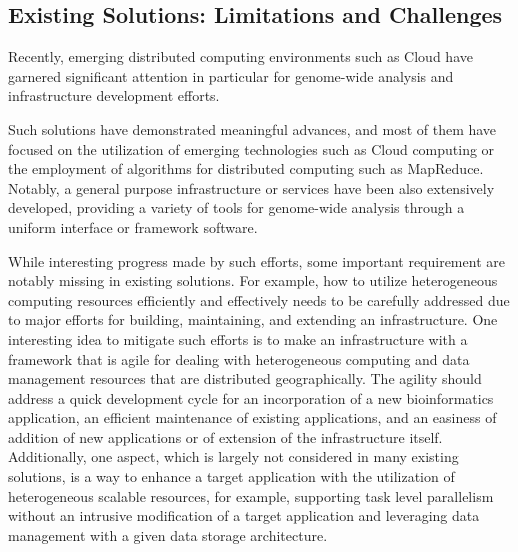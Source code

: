 \documentclass{acm_proc_article-sp}
\begin{document}
\subsection{Existing Solutions: Limitations and Challenges}


Recently, emerging distributed computing environments such as Cloud have garnered significant attention in particular for genome-wide analysis and infrastructure development efforts\cite{taylor2010,cloudburst,
  cloudblast, langmead2009, langmead2010,gatk, halligan2009}. 


Such solutions have demonstrated meaningful advances, and most of them have focused on the utilization of emerging technologies such as Cloud computing or the employment of algorithms for distributed computing such as MapReduce.  Notably, a general purpose infrastructure or services have been also extensively developed, providing a variety of tools for genome-wide analysis through a uniform interface or framework software\cite{galaxy}. 

While interesting progress made by such efforts, some important requirement are notably missing in existing solutions. For example,
how to utilize heterogeneous computing resources efficiently and effectively needs to be carefully addressed due to major efforts for building, maintaining, and extending an infrastructure.  One interesting idea to mitigate such efforts is to make an infrastructure with a framework that is agile for dealing with heterogeneous computing and data management resources that are distributed geographically.  The agility should address a quick development cycle for an incorporation of a new bioinformatics application, an efficient maintenance of existing applications, and an easiness of addition of new applications or of extension of the infrastructure itself.  Additionally, one aspect, which is largely not considered in many existing solutions, is a way to enhance a target application with the utilization of heterogeneous scalable resources, for example, supporting task level parallelism without an intrusive modification of a target application and leveraging data management with a given data storage architecture.
\end{document}
